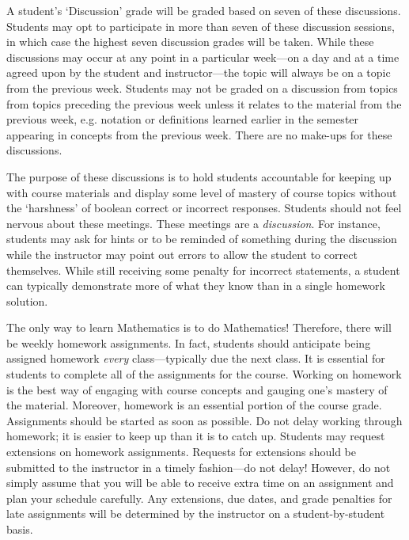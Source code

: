 \documentclass[11pt,letterpaper]{article}
\begin{document}
A student's `Discussion' grade will be graded based on seven of these discussions. Students may opt to participate in more than seven of these discussion sessions, in which case the highest seven discussion grades will be taken. While these discussions may occur at any point in a particular week---on a day and at a time agreed upon by the student and instructor---the topic will always be on a topic from the previous week. Students may not be graded on a discussion from topics from topics preceding the previous week unless it relates to the material from the previous week, e.g. notation or definitions learned earlier in the semester appearing in concepts from the previous week. There are no make-ups for these discussions. \pspace

The purpose of these discussions is to hold students accountable for keeping up with course materials and display some level of mastery of course topics without the `harshness' of boolean correct or incorrect responses. Students should not feel nervous about these meetings. These meetings are a {\itshape discussion}. For instance, students may ask for hints or to be reminded of something during the discussion while the instructor may point out errors to allow the student to correct themselves. While still receiving some penalty for incorrect statements, a student can typically demonstrate more of what they know than in a single homework solution. \sectionbreak



The only way to learn Mathematics is to do Mathematics! Therefore, there will be weekly homework assignments. In fact, students should anticipate being assigned homework {\itshape every} class---typically due the next class. It is essential for students to complete all of the assignments for the course. Working on homework is the best way of engaging with course concepts and gauging one's mastery of the material. Moreover, homework is an essential portion of the course grade. Assignments should be started as soon as possible. Do not delay working through homework; it is easier to keep up than it is to catch up. Students may request extensions on homework assignments. Requests for extensions should be submitted to the instructor in a timely fashion---do not delay! However, do not simply assume that you will be able to receive extra time on an assignment and plan your schedule carefully. Any extensions, due dates, and grade penalties for late assignments will be determined by the instructor on a student-by-student basis. \pspace
\end{document}
